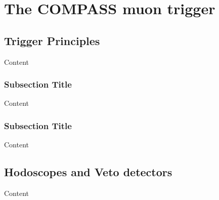 
\chapter{The COMPASS muon trigger} %

\label{ch:trig} %


\section{Trigger Principles}

Content


\subsection{Subsection Title}

Content


\subsection{Subsection Title}

Content


\section{Hodoscopes and Veto detectors}

Content
